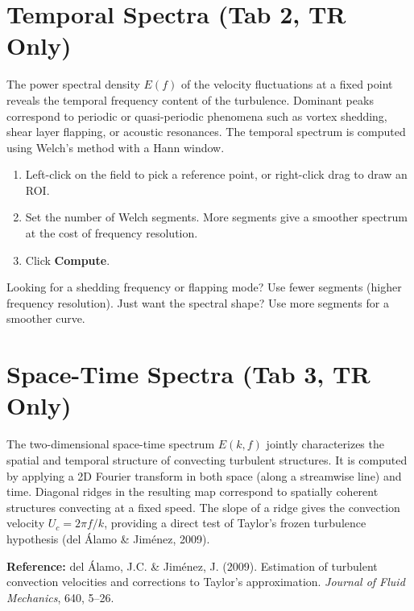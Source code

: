 \documentclass[11pt, a4paper]{report}
\newcommand{\uipth}[1]{\textbf{\textcolor{upblue}{#1}}}
\begin{document}
\section{Temporal Spectra (Tab 2, TR Only)}

The power spectral density $E(f)$ of the velocity fluctuations at a fixed point reveals the temporal frequency content of the turbulence. Dominant peaks correspond to periodic or quasi-periodic phenomena such as vortex shedding, shear layer flapping, or acoustic resonances. The temporal spectrum is computed using Welch's method with a Hann window.

\begin{stepbox}
\begin{enumerate}[leftmargin=1.5em, topsep=2pt]
  \item Left-click on the field to pick a reference point, or right-click drag to draw an ROI.
  \item Set the number of Welch segments. More segments give a smoother spectrum at the cost of frequency resolution.
  \item Click \uipth{Compute}.
\end{enumerate}
\end{stepbox}

\begin{tipbox}
Looking for a shedding frequency or flapping mode? Use fewer segments (higher frequency resolution). Just want the spectral shape? Use more segments for a smoother curve.
\end{tipbox}

\section{Space-Time Spectra (Tab 3, TR Only)}

The two-dimensional space-time spectrum $E(k, f)$ jointly characterizes the spatial and temporal structure of convecting turbulent structures. It is computed by applying a 2D Fourier transform in both space (along a streamwise line) and time. Diagonal ridges in the resulting map correspond to spatially coherent structures convecting at a fixed speed. The slope of a ridge gives the convection velocity $U_c = 2\pi f / k$, providing a direct test of Taylor's frozen turbulence hypothesis (del \'{A}lamo \& Jim\'{e}nez, 2009).

\noindent\textbf{Reference:} del \'{A}lamo, J.C. \& Jim\'{e}nez, J. (2009). Estimation of turbulent convection velocities and corrections to Taylor's approximation. \textit{Journal of Fluid Mechanics}, 640, 5--26.
\end{document}
